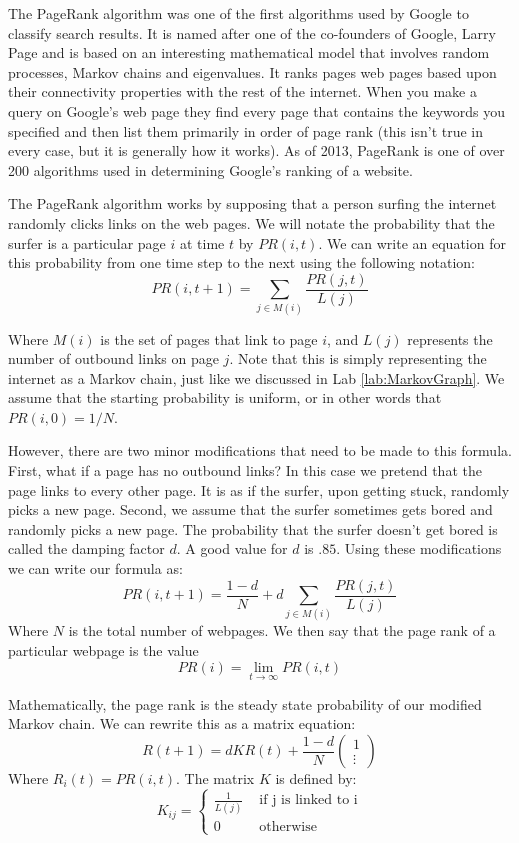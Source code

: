 \label{lab:PageRank}

The PageRank algorithm was one of the first algorithms used by Google to classify search results.
It is named after one of the co-founders of Google, Larry Page and is based on an interesting mathematical model that involves random processes, Markov chains and eigenvalues.
It ranks pages web pages based upon their connectivity properties with the rest of the internet.
When you make a query on Google's web page they find every page that contains the keywords you specified and then list them primarily in order of page rank (this isn't true in every case, but it is generally how it works).
As of 2013, PageRank is one of over 200 algorithms used in determining Google's ranking of a website.

The PageRank algorithm works by supposing that a person surfing the internet randomly clicks links on the web pages.
We will notate the probability that the surfer is a particular page $i$ at time $t$ by $PR(i,t)$.
We can write an equation for this probability from one time step to the next using the following notation:
\[PR(i,t+1) = \sum_{j \in M(i)} \frac{PR(j,t)}{L(j)}\]

Where $M(i)$ is the set of pages that link to page $i$, and $L(j)$ represents the number of outbound links on page $j$.
Note that this is simply representing the internet as a Markov chain, just like we discussed in Lab \ref{lab:MarkovGraph}.
We assume that the starting probability is uniform, or in other words that $PR(i,0) = 1/N$.

However, there are two minor modifications that need to be made to this formula.
First, what if a page has no outbound links?
In this case we pretend that the page links to every other page.
It is as if the surfer, upon getting stuck, randomly picks a new page.
Second, we assume that the surfer sometimes gets bored and randomly picks a new page.
The probability that the surfer doesn't get bored is called the damping factor $d$.
A good value for $d$ is $.85$.
Using these modifications we can write our formula as:
\[
PR(i,t+1) = \frac{1-d}{N} + d\sum_{j \in M(i)} \frac{PR(j,t)}{L(j)}
\]
Where $N$ is the total number of webpages.
We then say that the page rank of a particular webpage is the value
\[PR(i) = \lim_{t\to \infty} PR(i,t)\]

Mathematically, the page rank is the steady state probability of our modified Markov chain.
We can rewrite this as a matrix equation:
\[R(t+1) = d K R(t) + \frac{1-d}{N} \begin{pmatrix}1\\\vdots\end{pmatrix}\]
Where $R_i(t) = PR(i,t)$.
The matrix $K$ is defined by:
\[K_{ij} = \begin{cases} \frac{1}{L(j)} & \mbox{ if j is linked to i} \\ 0 & \mbox{ otherwise} \end{cases}\]

